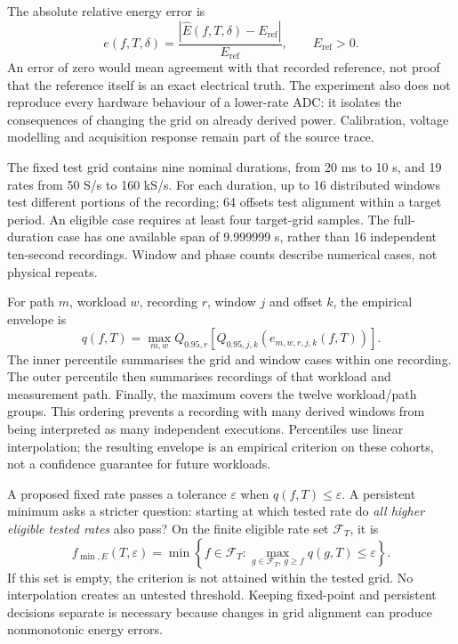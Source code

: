 The absolute relative energy error is
\begin{equation}
e(f,T,\delta)=\frac{|\widehat E(f,T,\delta)-E_{\mathrm{ref}}|}{E_{\mathrm{ref}}},
\qquad E_{\mathrm{ref}}>0.
\label{eq:reconstruction-error}
\end{equation}
An error of zero would mean agreement with that recorded reference, not proof that the reference itself is an exact electrical truth. The experiment also does not reproduce every hardware behaviour of a lower-rate ADC: it isolates the consequences of changing the grid on already derived power. Calibration, voltage modelling and acquisition response remain part of the source trace.

The fixed test grid contains nine nominal durations, from 20 ms to 10 s, and 19 rates from 50 S/s to 160 kS/s. For each duration, up to 16 distributed windows test different portions of the recording; 64 offsets test alignment within a target period. An eligible case requires at least four target-grid samples. The full-duration case has one available span of 9.999999 s, rather than 16 independent ten-second recordings. Window and phase counts describe numerical cases, not physical repeats.

For path $m$, workload $w$, recording $r$, window $j$ and offset $k$, the empirical envelope is
\begin{equation}
q(f,T)=\max_{m,w}Q_{0.95,r}
\left[Q_{0.95,j,k}\left(e_{m,w,r,j,k}(f,T)\right)\right].
\label{eq:hierarchy}
\end{equation}
The inner percentile summarises the grid and window cases within one recording. The outer percentile then summarises recordings of that workload and measurement path. Finally, the maximum covers the twelve workload/path groups. This ordering prevents a recording with many derived windows from being interpreted as many independent executions. Percentiles use linear interpolation; the resulting envelope is an empirical criterion on these cohorts, not a confidence guarantee for future workloads.

A proposed fixed rate passes a tolerance $\varepsilon$ when $q(f,T)\leq\varepsilon$. A persistent minimum asks a stricter question: starting at which tested rate do \emph{all higher eligible tested rates} also pass? On the finite eligible rate set $\mathcal F_T$, it is
\begin{equation}
f_{\min,E}(T,\varepsilon)=\min\left\{f\in\mathcal F_T:
\max_{g\in\mathcal F_T,\,g\geq f}q(g,T)\leq\varepsilon\right\}.
\label{eq:persistent}
\end{equation}
If this set is empty, the criterion is not attained within the tested grid. No interpolation creates an untested threshold. Keeping fixed-point and persistent decisions separate is necessary because changes in grid alignment can produce nonmonotonic energy errors.

